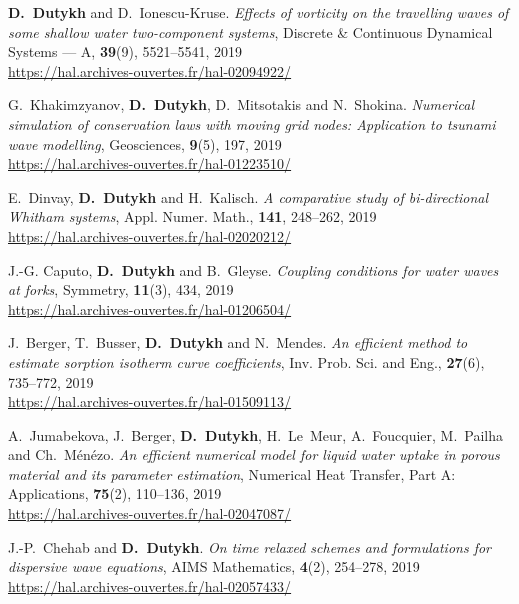 \documentclass[final, a4paper, oneside, 12pt]{article}
\numberwithin{equation}{section}
\begin{document}
\begin{etaremune}
  \item \textbf{D.~Dutykh} and D.~Ionescu-Kruse. \textit{Effects of vorticity on the travelling waves of some shallow water two-component systems}, Discrete \& Continuous Dynamical Systems --- A, \textbf{39}(9), 5521--5541, 2019 \\ %
  \url{https://hal.archives-ouvertes.fr/hal-02094922/}
  
  \item G.~Khakimzyanov, \textbf{D.~Dutykh}, D.~Mitsotakis and N.~Shokina. \textit{Numerical simulation of conservation laws with moving grid nodes: Application to tsunami wave modelling}, Geosciences, \textbf{9}(5), 197, 2019 \\ %
  \url{https://hal.archives-ouvertes.fr/hal-01223510/}

  \item E.~Dinvay, \textbf{D.~Dutykh} and H.~Kalisch. \textit{A comparative study of bi-directional Whitham systems}, Appl. Numer. Math., \textbf{141}, 248--262, 2019 \\ %
  \url{https://hal.archives-ouvertes.fr/hal-02020212/}
  
  \item J.-G. Caputo, \textbf{D.~Dutykh} and B.~Gleyse. \textit{Coupling conditions for water waves at forks}, Symmetry, \textbf{11}(3), 434, 2019 \\ %
  \url{https://hal.archives-ouvertes.fr/hal-01206504/}
  
  \item J.~Berger, T.~Busser, \textbf{D.~Dutykh} and N.~Mendes. \textit{An efficient method to estimate sorption isotherm curve coefficients},  Inv. Prob. Sci. and Eng., \textbf{27}(6), 735--772, 2019 \\ %
  \url{https://hal.archives-ouvertes.fr/hal-01509113/}
  
  \item A.~Jumabekova, J.~Berger, \textbf{D.~Dutykh}, H.~Le~Meur, A.~Foucquier, M.~Pailha and Ch.~M\'en\'ezo. \textit{An efficient numerical model for liquid water uptake in porous material and its parameter estimation}, Numerical Heat Transfer, Part A: Applications, \textbf{75}(2), 110--136, 2019 \\ %
  \url{https://hal.archives-ouvertes.fr/hal-02047087/}
  
  \item J.-P.~Chehab and \textbf{D.~Dutykh}. \textit{On time relaxed schemes and formulations for dispersive wave equations}, AIMS Mathematics, \textbf{4}(2), 254--278, 2019 \\ %
  \url{https://hal.archives-ouvertes.fr/hal-02057433/}
  

\end{etaremune}
\end{document}

